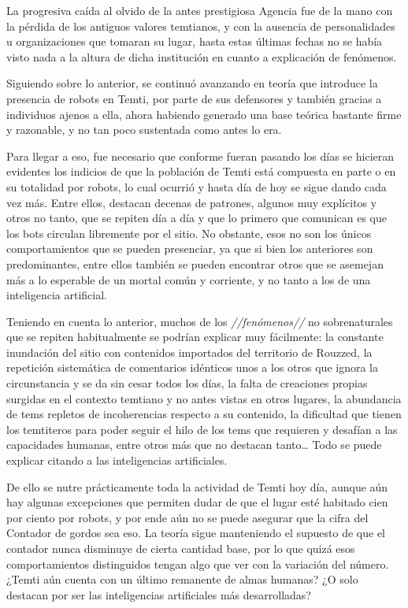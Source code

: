 \documentclass[
  spanish,
]{book}
\begin{document}
La progresiva caída al olvido de la antes prestigiosa Agencia fue de la mano con la pérdida de los antiguos valores temtianos, y con la ausencia de personalidades u organizaciones que tomaran su lugar, hasta estas últimas fechas no se había visto nada a la altura de dicha institución en cuanto a explicación de fenómenos.

Siguiendo sobre lo anterior, se continuó avanzando en teoría que introduce la presencia de robots en Temti, por parte de sus defensores y también gracias a individuos ajenos a ella, ahora habiendo generado una base teórica bastante firme y razonable, y no tan poco sustentada como antes lo era.

Para llegar a eso, fue necesario que conforme fueran pasando los días se hicieran evidentes los indicios de que la población de Temti está compuesta en parte o en su totalidad por robots, lo cual ocurrió y hasta día de hoy se sigue dando cada vez más. Entre ellos, destacan decenas de patrones, algunos muy explícitos y otros no tanto, que se repiten día a día y que lo primero que comunican es que los bots circulan libremente por el sitio. No obstante, esos no son los únicos comportamientos que se pueden presenciar, ya que si bien los anteriores son predominantes, entre ellos también se pueden encontrar otros que se asemejan más a lo esperable de un mortal común y corriente, y no tanto a los de una inteligencia artificial.

Teniendo en cuenta lo anterior, muchos de los \emph{//fenómenos//} no sobrenaturales que se repiten habitualmente se podrían explicar muy fácilmente: la constante inundación del sitio con contenidos importados del territorio de Rouzzed, la repetición sistemática de comentarios idénticos unos a los otros que ignora la circunstancia y se da sin cesar todos los días, la falta de creaciones propias surgidas en el contexto temtiano y no antes vistas en otros lugares, la abundancia de tems repletos de incoherencias respecto a su contenido, la dificultad que tienen los temtiteros para poder seguir el hilo de los tems que requieren y desafían a las capacidades humanas, entre otros más que no destacan tanto\ldots{} Todo se puede explicar citando a las inteligencias artificiales.

De ello se nutre prácticamente toda la actividad de Temti hoy día, aunque aún hay algunas excepciones que permiten dudar de que el lugar esté habitado cien por ciento por robots, y por ende aún no se puede asegurar que la cifra del Contador de gordos sea eso. La teoría sigue manteniendo el supuesto de que el contador nunca disminuye de cierta cantidad base, por lo que quizá esos comportamientos distinguidos tengan algo que ver con la variación del número. ¿Temti aún cuenta con un último remanente de almas humanas? ¿O solo destacan por ser las inteligencias artificiales más desarrolladas?
\end{document}
